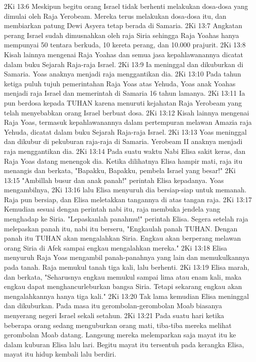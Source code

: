 2Ki 13:6  Meskipun begitu orang Israel tidak berhenti melakukan dosa-dosa yang dimulai oleh Raja Yerobeam. Mereka terus melakukan dosa-dosa itu, dan membiarkan patung Dewi Asyera tetap berada di Samaria.
2Ki 13:7  Angkatan perang Israel sudah dimusnahkan oleh raja Siria sehingga Raja Yoahas hanya mempunyai 50 tentara berkuda, 10 kereta perang, dan 10.000 prajurit.
2Ki 13:8  Kisah lainnya mengenai Raja Yoahas dan semua jasa kepahlawanannya dicatat dalam buku Sejarah Raja-raja Israel.
2Ki 13:9  Ia meninggal dan dikuburkan di Samaria. Yoas anaknya menjadi raja menggantikan dia.
2Ki 13:10  Pada tahun ketiga puluh tujuh pemerintahan Raja Yoas atas Yehuda, Yoas anak Yoahas menjadi raja Israel dan memerintah di Samaria 16 tahun lamanya.
2Ki 13:11  Ia pun berdosa kepada TUHAN karena menuruti kejahatan Raja Yerobeam yang telah menyebabkan orang Israel berbuat dosa.
2Ki 13:12  Kisah lainnya mengenai Raja Yoas, termasuk kepahlawanannya dalam pertempuran melawan Amazia raja Yehuda, dicatat dalam buku Sejarah Raja-raja Israel.
2Ki 13:13  Yoas meninggal dan dikubur di pekuburan raja-raja di Samaria. Yerobeam II anaknya menjadi raja menggantikan dia.
2Ki 13:14  Pada suatu waktu Nabi Elisa sakit keras, dan Raja Yoas datang menengok dia. Ketika dilihatnya Elisa hampir mati, raja itu menangis dan berkata, "Bapakku, Bapakku, pembela Israel yang besar!"
2Ki 13:15  "Ambillah busur dan anak panah!" perintah Elisa kepadanya. Yoas mengambilnya,
2Ki 13:16  lalu Elisa menyuruh dia bersiap-siap untuk memanah. Raja pun bersiap, dan Elisa meletakkan tangannya di atas tangan raja.
2Ki 13:17  Kemudian sesuai dengan perintah nabi itu, raja membuka jendela yang menghadap ke Siria. "Lepaskanlah panahmu!" perintah Elisa. Segera setelah raja melepaskan panah itu, nabi itu berseru, "Engkaulah panah TUHAN. Dengan panah itu TUHAN akan mengalahkan Siria. Engkau akan berperang melawan orang Siria di Afek sampai engkau mengalahkan mereka."
2Ki 13:18  Elisa menyuruh Raja Yoas mengambil panah-panahnya yang lain dan memukulkannya pada tanah. Raja memukul tanah tiga kali, lalu berhenti.
2Ki 13:19  Elisa marah, dan berkata, "Seharusnya engkau memukul sampai lima atau enam kali, maka engkau dapat menghancurleburkan bangsa Siria. Tetapi sekarang engkau akan mengalahkannya hanya tiga kali."
2Ki 13:20  Tak lama kemudian Elisa meninggal dan dikuburkan. Pada masa itu gerombolan-gerombolan Moab biasanya menyerang negeri Israel sekali setahun.
2Ki 13:21  Pada suatu hari ketika beberapa orang sedang menguburkan orang mati, tiba-tiba mereka melihat gerombolan Moab datang. Langsung mereka melemparkan saja mayat itu ke dalam kuburan Elisa lalu lari. Begitu mayat itu tersentuh pada kerangka Elisa, mayat itu hidup kembali lalu berdiri.
